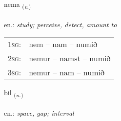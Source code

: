 \documentclass[frontgrid, backgrid]{flacards}\usepackage[]{graphicx}\usepackage[]{xcolor}
\begin{document}
\renewcommand{\flhead}{\vskip5pt \fboxsep=0pt {\small\bfseries\footnotesize Sagnorð | Verb}}
\renewcommand{\fcfoot}{\vskip5pt \fboxsep=0pt \hspace{2pt}{\small\bfseries\footnotesize 1K}}

\renewcommand{\blhead}{\vskip5pt {\small\bfseries\footnotesize Sagnorð | Verb }}
\renewcommand{\bcfoot}{\vskip5pt \hspace{2pt}{\small\bfseries\footnotesize 1K}}


{nema \small{\textsubscript{(\textit{v.})}} \\[1ex] %
\textphonetic{[nɛːma]} \\
en.: \emph{study; perceive, detect, amount to} \\  [2ex]
\renewcommand*{\arraystretch}{0.8}
\begin{tabular}{p{1cm}l}
\textsc{1sg}: & nem -- nam -- numið \\ 
\textsc{2sg}: & nemur -- namst -- numið \\ 
\textsc{3sg}: & nemur -- nam -- numið \\ 
\end{tabular}
}

\renewcommand{\flhead}{\vskip5pt \fboxsep=0pt {\small\bfseries\footnotesize Nafnorð | Noun}}
\renewcommand{\fcfoot}{\vskip5pt \fboxsep=0pt \hspace{2pt}{\small\bfseries\footnotesize 1K}}

\renewcommand{\blhead}{\vskip5pt {\small\bfseries\footnotesize Nafnorð | Noun }}
\renewcommand{\bcfoot}{\vskip5pt \hspace{2pt}{\small\bfseries\footnotesize 1K}}


{bil \small{\textsubscript{(\textit{n.})}} \\[1ex] %
\textphonetic{[pɪːl]} \\
en.: \emph{space, gap; interval} \\  [2ex]
\renewcommand*{\arraystretch}{0.8}
}
\end{document}
